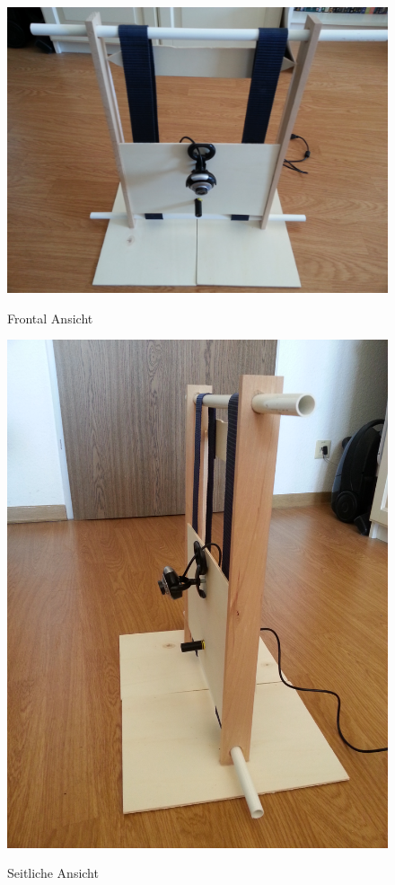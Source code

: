 \begin{figure}
\centering
\begin{minipage}{0.45\textwidth}
\centering \includegraphics[width=\textwidth]{images/Scanner1.jpg}\label{fig:scanner1}
\caption{Frontal Ansicht}
\end{minipage}
\begin{minipage}{0.45\textwidth}
\centering\includegraphics[width=\textwidth, angle = -90]{images/Scanner2.jpg}\label{fig:scanner2}
\caption{Seitliche Ansicht}
\end{minipage}
\end{figure}

